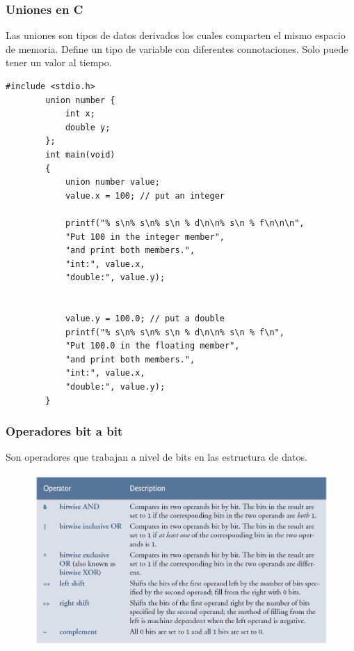 \documentclass[10.5pt,scale=1.0,t,aspectratio=169,hyperref={pdfpagelabels=false}]{beamer}
\begin{document}
\begin{frame}[fragile]
	\frametitle{Uniones en C}
	Las uniones son tipos de datos derivados los cuales comparten el mismo espacio de memoria. Define un tipo de variable con diferentes connotaciones. Solo puede tener un valor al tiempo. 
	
	\begin{lstlisting}[style=CStyle,basicstyle=\tiny]
		#include <stdio.h>
		union number {
			int x;
			double y;
		};
		int main(void)
		{
			union number value; 
			value.x = 100; // put an integer
			
			printf("% s\n% s\n% s\n % d\n\n% s\n % f\n\n\n",
			"Put 100 in the integer member",
			"and print both members.",
			"int:", value.x,
			"double:", value.y);
			
			
			value.y = 100.0; // put a double 
			printf("% s\n% s\n% s\n % d\n\n% s\n % f\n",
			"Put 100.0 in the floating member",
			"and print both members.",
			"int:", value.x,
			"double:", value.y);
		}
	\end{lstlisting}
\end{frame}
\begin{frame}
	\frametitle{Operadores bit a bit}
	Son operadores que trabajan a nivel de bits en las estructura de datos. 
	\begin{figure}
		\centering
		\includegraphics[scale=0.6]{Bitwise}
	\end{figure}
\end{frame}
\end{document}
